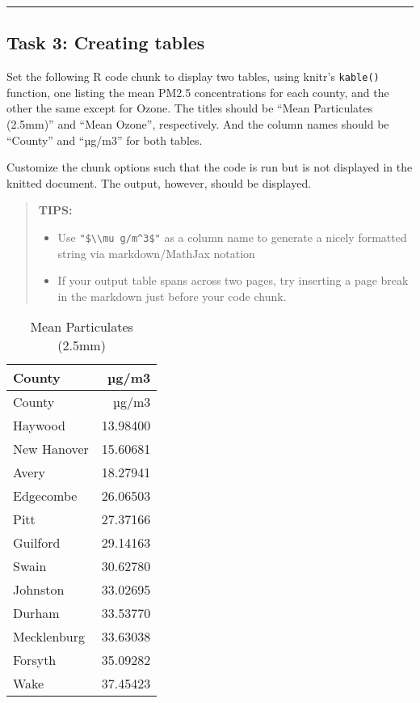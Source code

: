 \documentclass[
]{article}
\begin{document}
\begin{center}\rule{0.5\linewidth}{0.5pt}\end{center}

\hypertarget{task-3-creating-tables}{%
\subsection{Task 3: Creating tables}\label{task-3-creating-tables}}

Set the following R code chunk to display two tables, using knitr's
\texttt{kable()} function, one listing the mean PM2.5 concentrations for
each county, and the other the same except for Ozone. The titles should
be ``Mean Particulates (2.5mm)'' and ``Mean Ozone'', respectively. And
the column names should be ``County'' and ``µg/m3'' for both tables.

Customize the chunk options such that the code is run but is not
displayed in the knitted document. The output, however, should be
displayed.

\begin{quote}
\textbf{TIPS:}

\begin{itemize}
\item
  Use \texttt{"\$\textbackslash{}\textbackslash{}mu\ g/m\^{}3\$"} as a
  column name to generate a nicely formatted string via markdown/MathJax
  notation
\item
  If your output table spans across two pages, try inserting a page
  break in the markdown just before your code chunk.
\end{itemize}
\end{quote}

\begin{longtable}[]{@{}lr@{}}
\caption{Mean Particulates (2.5mm)}\tabularnewline
\toprule\noalign{}
County & µg/m3 \\
\midrule\noalign{}
\endfirsthead
\toprule\noalign{}
County & µg/m3 \\
\midrule\noalign{}
\endhead
\bottomrule\noalign{}
\endlastfoot
Haywood & 13.98400 \\
New Hanover & 15.60681 \\
Avery & 18.27941 \\
Edgecombe & 26.06503 \\
Pitt & 27.37166 \\
Guilford & 29.14163 \\
Swain & 30.62780 \\
Johnston & 33.02695 \\
Durham & 33.53770 \\
Mecklenburg & 33.63038 \\
Forsyth & 35.09282 \\
Wake & 37.45423 \\
\end{longtable}
\end{document}
